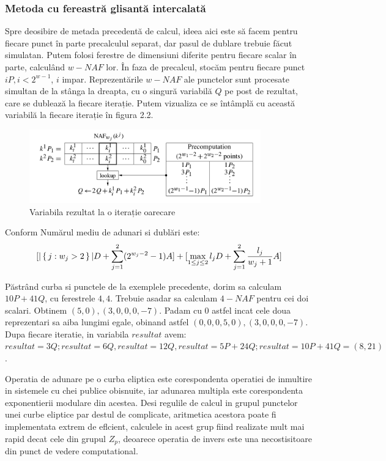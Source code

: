 \subsubsection{Metoda cu fereastră glisantă intercalată}

Spre deosibire de metada precedentă de calcul, ideea aici este să facem pentru fiecare punct în parte precalculul separat, dar pasul de dublare trebuie făcut simulatan. Putem folosi ferestre de dimensiuni diferite pentru fiecare scalar în parte, calculând $w-NAF$ lor. În faza de precalcul, stocăm pentru fiecare punct $iP, i<2^{w-1}$, $i$ impar. Reprezentările $w-NAF$ ale punctelor sunt procesate simultan de la stânga la dreapta, cu o singură variabilă $Q$ pe post de rezultat, care se dublează la fiecare iterație. Putem vizualiza ce se întâmplă cu această variabilă la fiecare iterație  în figura 2.2.

\begin{figure}[htp]
\centering
\includegraphics[width=10cm]{chapters/interleaving.png}
\caption{Variabila rezultat la o iterație oarecare}
\label{fig:lion}
\end{figure}

\begin{obs}

Conform \cite{interleaving} Numărul mediu de adunari si dublări este:
$$[|\set{j:w_j>2}|D+\sum_{j=1}^{2}(2^{w_j-2}-1)A]+[\max_{1\leq j\leq 2} l_jD + \sum_{j=1}^{2}\frac{l_j}{w_j+1}A]$$
\end{obs}

\begin{ex}
Păstrând curba si punctele de la exemplele precedente, dorim sa calculam $10P + 41Q$, cu ferestrele $4, 4$. Trebuie asadar sa calculam $4-NAF$ pentru cei doi scalari. Obtinem $(5, 0), (3, 0, 0, 0, -7)$. Padam cu 0 astfel incat cele doua reprezentari sa aiba lungimi egale, obinand astfel $(0, 0, 0, 5, 0), (3, 0, 0, 0, -7)$. Dupa fiecare iteratie, in variabila $resultat$ avem: $resultat = 3Q; resultat = 6Q, resultat=12Q, resultat = 5P + 24Q; resultat = 10P + 41Q = (8, 21)$.
\end{ex}


\begin{obs}
Operatia de adunare pe o curba eliptica este corespondenta operatiei de inmultire
in sistemele cu chei publice obisnuite, iar adunarea multipla este corespondenta
exponentierii modulare din acestea.
Desi regulile de calcul in grupul punctelor unei curbe eliptice par destul de complicate, aritmetica acestora poate fi implementata extrem de eflcient, calculele in acest grup fiind realizate mult mai rapid decat cele din grupul $Z_p$, deoarece operatia de invers este una necostisitoare din punct de vedere computational.
\end{obs}





